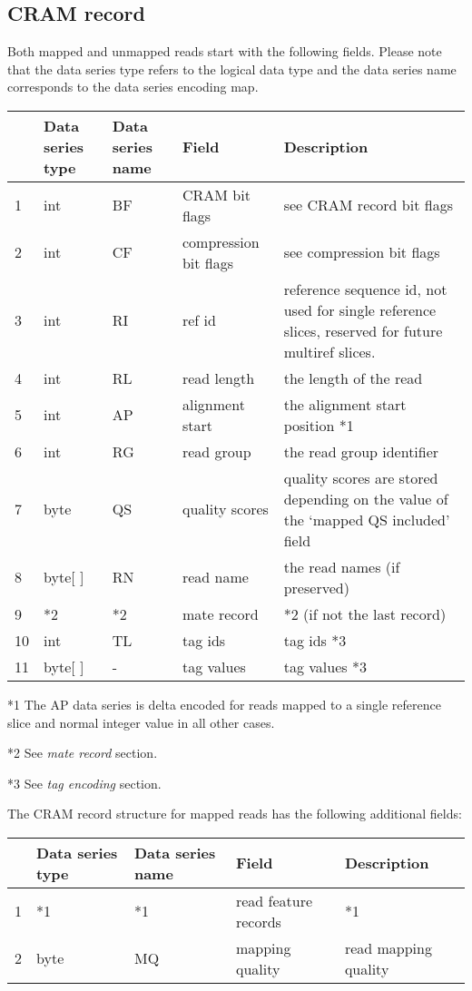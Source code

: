 \documentclass[a4paper]{article}
\begin{document}
\subsection{\textbf{CRAM record}}

Both mapped and unmapped reads start with the following fields. Please note that 
the data series type refers to the logical data type and the data series name corresponds 
to the data series encoding map.

\begin{tabular}{|>{\raggedright}p{36pt}|>{\raggedright}p{70pt}|>{\raggedright}p{75pt}|>{\raggedright}p{90pt}|>{\raggedright}p{171pt}|}
\hline
 & \textbf{Data series type} & \textbf{Data series name} & \textbf{Field} & \textbf{Description}\tabularnewline
\hline
1 & int & BF & CRAM bit flags & see CRAM record bit flags\tabularnewline
\hline
2 & int & CF  & compression bit flags & see compression bit flags\tabularnewline
\hline
3 & int & RI & ref id & reference sequence id, not used for single reference slices, 
reserved for future multiref slices. \tabularnewline
\hline
4 & int & RL & read length & the length of the read\tabularnewline
\hline
5 & int & AP & alignment start & the alignment start position *1\tabularnewline
\hline
6 & int & RG & read group & the read group identifier\tabularnewline
\hline
7 & byte & QS & quality scores & quality scores are stored depending on the value 
of the `mapped QS included' field\tabularnewline
\hline
8 & byte[ ] & RN & read name & the read names (if preserved)\tabularnewline
\hline
9 & *2 & *2 & mate record & *2 (if not the last record)\tabularnewline
\hline
10 & int & TL & tag ids & tag ids *3\tabularnewline
\hline
11 & byte[ ] & - & tag values & tag values *3\tabularnewline
\hline
\end{tabular}

*1 The AP data series is delta encoded for reads mapped to a single reference slice 
and normal integer value in all other cases. 

*2 See \emph{mate record} section.

*3 See\emph{ tag encoding} section.

The CRAM record structure for mapped reads has the following additional fields:

\begin{tabular}{|>{\raggedright}p{36pt}|>{\raggedright}p{70pt}|>{\raggedright}p{74pt}|>{\raggedright}p{85pt}|>{\raggedright}p{177pt}|}
\hline
 & \textbf{Data series type} & \textbf{Data series name} & \textbf{Field} & \textbf{Description}\tabularnewline
\hline
1 & *1 & *1 & read feature records & *1\tabularnewline
\hline
2 & byte & MQ & mapping quality & read mapping quality\tabularnewline
\hline
\end{tabular}
\end{document}
